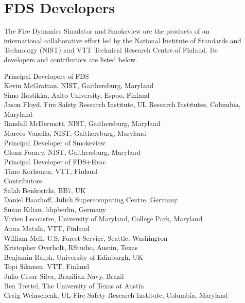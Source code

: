 \chapter{FDS Developers}

The Fire Dynamics Simulator and Smokeview are the products of an international collaborative effort led by
the National Institute of Standards and Technology (NIST) and VTT Technical Research Centre of Finland. Its developers and
contributors are listed below.

\vspace{0.3in}

\begin{flushleft}

Principal Developers of FDS  \\ [0.2in]

Kevin McGrattan, NIST, Gaithersburg, Maryland \\
Simo Hostikka, Aalto University, Espoo, Finland \\
Jason Floyd, Fire Safety Research Institute, UL Research Institutes, Columbia, Maryland \\
Randall McDermott, NIST, Gaithersburg, Maryland \\
Marcos Vanella, NIST, Gaithersburg, Maryland \\ [0.3in]

Principal Developer of Smokeview  \\ [0.2in]

Glenn Forney, NIST, Gaithersburg, Maryland \\ [0.3in]

Principal Developer of FDS+Evac  \\ [0.2in]

Timo Korhonen, VTT, Finland \\ [0.3in]

Contributors \\ [0.2in]

Salah Benkorichi, BB7, UK \\
Daniel Haarhoff, J\"ulich Supercomputing Centre, Germany \\
Susan Kilian, hhpberlin, Germany \\
Vivien Lecoustre, University of Maryland, College Park, Maryland \\
Anna Matala, VTT, Finland \\
William Mell, U.S. Forest Service, Seattle, Washington \\
Kristopher Overholt, RStudio, Austin, Texas \\
Benjamin Ralph, University of Edinburgh, UK \\
Topi Sikanen, VTT, Finland \\
Julio Cesar Silva, Brazilian Navy, Brazil \\
Ben Trettel, The University of Texas at Austin \\
Craig Weinschenk, UL Fire Safety Research Institute, Columbia, Maryland

\end{flushleft}


